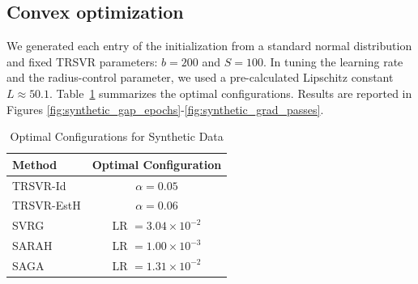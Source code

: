 \documentclass{article}
\theoremstyle{plain}
\theoremstyle{definition}
\theoremstyle{remark}
\begin{document}
\subsection{Convex optimization}


We generated each entry of the initialization from a standard normal distribution and fixed TRSVR parameters: $b = 200$ and $S = 100$. In tuning the learning rate and the radius-control parameter, we used a pre-calculated Lipschitz constant $L \approx 50.1$. Table~\ref{tab:results} summarizes the optimal configurations. Results are reported in Figures \ref{fig:synthetic_gap_epochs}-\ref{fig:synthetic_grad_passes}.

\begin{table}[ht]
    \centering
    \caption{Optimal Configurations for Synthetic Data}
    \label{tab:results}
    \begin{tabular}{lc}
        \toprule
        \textbf{Method} & \textbf{Optimal Configuration} \\
        \midrule
        TRSVR-Id & $\alpha = 0.05$ \\
        TRSVR-EstH & $\alpha = 0.06$ \\
        \midrule
        SVRG & LR $= 3.04 \times 10^{-2}$ \\
        SARAH & LR $= 1.00 \times 10^{-3}$ \\
        SAGA & LR $= 1.31 \times 10^{-2}$ \\
        \bottomrule
    \end{tabular}
\end{table}
\end{document}
